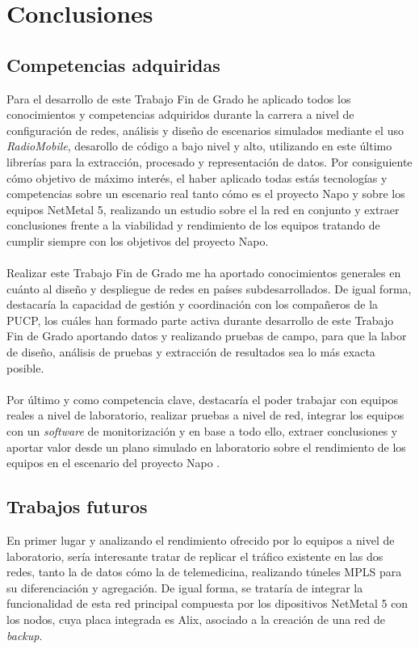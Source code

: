 \chapter{Conclusiones}
\label{cap:conclusion}

\section{Competencias adquiridas}
Para el desarrollo de este Trabajo Fin de Grado he aplicado todos los conocimientos y competencias adquiridos durante la carrera a nivel de configuración de redes, análisis y diseño de escenarios simulados mediante el uso \textit{RadioMobile}, desarollo de código a bajo nivel y alto, utilizando en este último librerías para la extracción, procesado y representación de datos. Por consiguiente cómo objetivo de máximo interés, el haber aplicado todas estás tecnologías y competencias sobre un escenario real tanto cómo es el proyecto Napo y sobre los equipos NetMetal 5, realizando un estudio sobre el la red en conjunto y extraer conclusiones frente a la viabilidad y rendimiento de los equipos tratando de cumplir siempre con los objetivos del proyecto Napo.\\\\

Realizar este Trabajo Fin de Grado me ha aportado conocimientos generales en cuánto al diseño y despliegue de redes en países subdesarrollados. De igual forma, destacaría la capacidad de gestión y coordinación con los compañeros de la PUCP, los cuáles han formado parte activa durante desarrollo de este Trabajo Fin de Grado aportando datos y realizando pruebas de campo, para que la labor de diseño, análisis de pruebas y extracción de resultados sea lo más exacta posible. \\\\

Por último y como competencia clave, destacaría el poder trabajar con equipos reales a nivel de laboratorio, realizar pruebas a nivel de red, integrar los equipos con un \textit{software} de monitorización y en base a todo ello, extraer conclusiones y aportar valor desde un plano simulado en laboratorio sobre el rendimiento de los equipos en el escenario del proyecto Napo .

\section{Trabajos futuros}
En primer lugar y analizando el rendimiento ofrecido por lo equipos a nivel de laboratorio, sería interesante tratar de replicar el tráfico existente en las dos redes, tanto la de datos cómo la de telemedicina, realizando túneles MPLS para su diferenciación y agregación. De igual forma, se trataría de integrar la funcionalidad de esta red principal compuesta por los dipositivos NetMetal 5 con los nodos, cuya placa integrada es Alix, asociado a la creación de una red de \textit{backup}.\\\\

